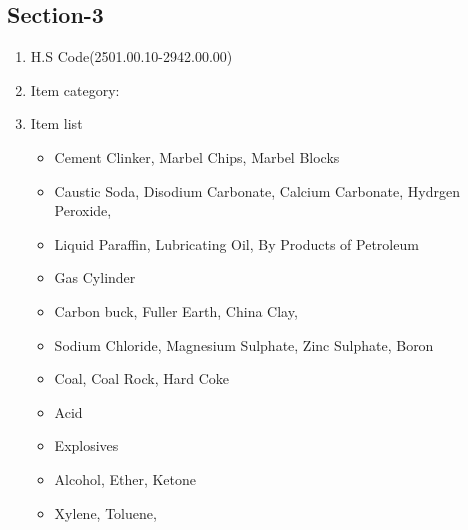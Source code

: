 \documentclass[10pt]{article}
\begin{document}
\subsection{Section-3}\label{sec-3}
\begin{enumerate}
    \item H.S Code(2501.00.10-2942.00.00)
    \item Item category: 
    \item Item list
\begin{itemize}
    \item Cement Clinker, Marbel Chips,
        Marbel Blocks
    \item Caustic Soda, Disodium Carbonate, Calcium
        Carbonate, Hydrgen Peroxide,
    \item Liquid Paraffin, Lubricating Oil,
        By Products of Petroleum
    \item Gas Cylinder
    \item Carbon buck, Fuller Earth, China Clay, 
    \item Sodium Chloride, Magnesium Sulphate,
        Zinc Sulphate, Boron
    \item Coal, Coal Rock, Hard Coke
    \item Acid
    \item Explosives
    \item Alcohol, Ether, Ketone
    \item Xylene, Toluene, 
\end{itemize}
\end{enumerate}
\end{document}
